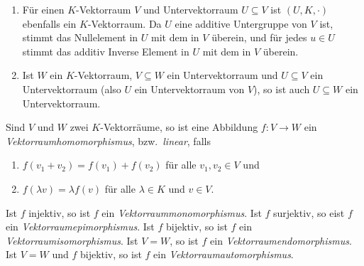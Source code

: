 \begin{bem}
 \begin{enumerate}[leftmargin=*]
  \item
   Für einen $K$-Vektorraum $V$ und Untervektorraum $U \subseteq V$ ist $(U,K,\cdot)$ ebenfalls ein $K$-Vektorraum. Da $U$ eine additive Untergruppe von $V$ ist, stimmt das Nullelement in $U$ mit dem in $V$ überein, und für jedes $u \in U$ stimmt das additiv Inverse Element in $U$ mit dem in $V$ überein.
  \item
   Ist $W$ ein $K$-Vektorraum, $V \subseteq W$ ein Untervektorraum und $U \subseteq V$ ein Untervektorraum (also $U$ ein Untervektorraum von $V$), so ist auch $U \subseteq W$ ein Untervektorraum.
 \end{enumerate}
\end{bem}


\begin{defi}
 Sind $V$ und $W$ zwei $K$-Vektorräume, so ist eine Abbildung $f \colon V \to W$ ein \emph{Vektorraumhomomorphismus}, bzw.\ \emph{linear}, falls
 \begin{enumerate}[label=\roman*)]
  \item
   $f(v_1 + v_2) = f(v_1) + f(v_2)$ für alle $v_1, v_2 \in V$ und
  \item
   $f(\lambda v) = \lambda f(v)$ für alle $\lambda \in K$ und $v \in V$.
 \end{enumerate}
 Ist $f$ injektiv, so ist $f$ ein \emph{Vektorraummonomorphismus}. Ist $f$ surjektiv, so eist $f$ ein \emph{Vektorraumepimorphismus}. Ist $f$ bijektiv, so ist $f$ ein \emph{Vektorraumisomorphismus}. Ist $V = W$, so ist $f$ ein \emph{Vektorraumendomorphismus}. Ist $V = W$ und $f$ bijektiv, so ist $f$ ein \emph{Vektorraumautomorphismus}.
\end{defi}


